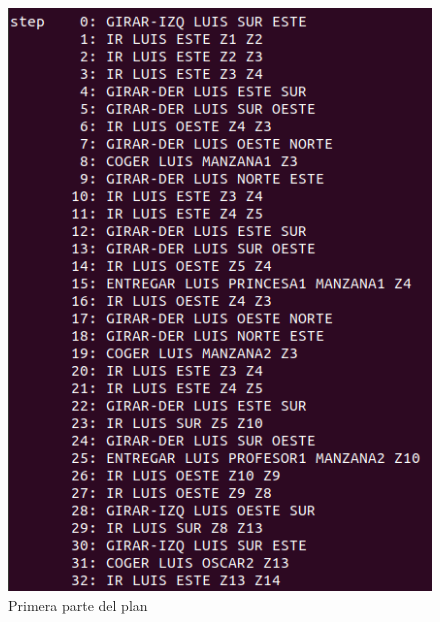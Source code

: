 \begin{figure}[H]
	\begin{minipage}[b]{0.5\linewidth}
		\centering
		\includegraphics[width=\linewidth]{ej5-1.png}
		\caption{Primera parte del plan}
		\label{fig:ej5-1}
	\end{minipage}
	\hspace{0.5cm}
	\begin{minipage}[b]{0.5\linewidth}
		\centering

\end{minipage}
\end{figure}
